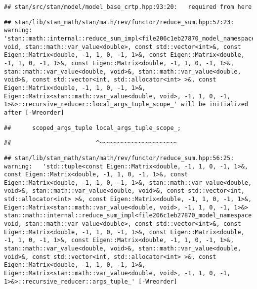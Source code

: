 \documentclass[
]{article}
\begin{document}
\begin{verbatim}
## stan/src/stan/model/model_base_crtp.hpp:93:20:   required from here
\end{verbatim}

\begin{verbatim}
## stan/lib/stan_math/stan/math/rev/functor/reduce_sum.hpp:57:23: warning: 'stan::math::internal::reduce_sum_impl<file206c1eb27870_model_namespace::partial_log_lik_rsfunctor__, void, stan::math::var_value<double>, const std::vector<int>&, const Eigen::Matrix<double, -1, 1, 0, -1, 1>&, const Eigen::Matrix<double, -1, 1, 0, -1, 1>&, const Eigen::Matrix<double, -1, 1, 0, -1, 1>&, stan::math::var_value<double, void>&, stan::math::var_value<double, void>&, const std::vector<int, std::allocator<int> >&, const Eigen::Matrix<double, -1, 1, 0, -1, 1>&, Eigen::Matrix<stan::math::var_value<double, void>, -1, 1, 0, -1, 1>&>::recursive_reducer::local_args_tuple_scope_' will be initialized after [-Wreorder]
\end{verbatim}

\begin{verbatim}
##      scoped_args_tuple local_args_tuple_scope_;
\end{verbatim}

\begin{verbatim}
##                        ^~~~~~~~~~~~~~~~~~~~~~~
\end{verbatim}

\begin{verbatim}
## stan/lib/stan_math/stan/math/rev/functor/reduce_sum.hpp:56:25: warning:   'std::tuple<const Eigen::Matrix<double, -1, 1, 0, -1, 1>&, const Eigen::Matrix<double, -1, 1, 0, -1, 1>&, const Eigen::Matrix<double, -1, 1, 0, -1, 1>&, stan::math::var_value<double, void>&, stan::math::var_value<double, void>&, const std::vector<int, std::allocator<int> >&, const Eigen::Matrix<double, -1, 1, 0, -1, 1>&, Eigen::Matrix<stan::math::var_value<double, void>, -1, 1, 0, -1, 1>&> stan::math::internal::reduce_sum_impl<file206c1eb27870_model_namespace::partial_log_lik_rsfunctor__, void, stan::math::var_value<double>, const std::vector<int>&, const Eigen::Matrix<double, -1, 1, 0, -1, 1>&, const Eigen::Matrix<double, -1, 1, 0, -1, 1>&, const Eigen::Matrix<double, -1, 1, 0, -1, 1>&, stan::math::var_value<double, void>&, stan::math::var_value<double, void>&, const std::vector<int, std::allocator<int> >&, const Eigen::Matrix<double, -1, 1, 0, -1, 1>&, Eigen::Matrix<stan::math::var_value<double, void>, -1, 1, 0, -1, 1>&>::recursive_reducer::args_tuple_' [-Wreorder]
\end{verbatim}
\end{document}
